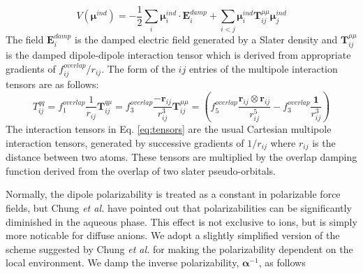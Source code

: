 \documentclass[journal=jctcce,manuscript=article]{achemso}
\begin{document}
\begin{equation}
  V(\bm{\mu}^{ind})=-\frac12\sum_i \bm{\mu}_i^{ind}\cdot \bm{E}_i^{damp} + \sum_{i<j}\bm{\mu}^{ind}_i \bm{T}^{\mu\mu}_{ij}\bm{\mu}^{ind}_j
  \label{eq:induced_dipoles}
\end{equation}
The field $\bm{E}_i^{damp}$ is the damped electric field generated by a Slater density
and $\bm{T}^{\mu\mu}_{ij}$ is the damped dipole-dipole interaction tensor which is derived from appropriate
gradients of $f_{ij}^{overlap}/r_{ij}$. The form of the $ij$ entries of the multipole interaction tensors are as follows:
\begin{subequations}
  \begin{equation}
    T^{qq}_{ij}=f_1^{overlap}\frac{1}{r_{ij}}
    \label{eq:tensors_a}
  \end{equation}
  \begin{equation}
  \bm{T}^{q\mu}_{ij}=f_3^{overlap}\frac{-\bm{r}_{ij}}{r_{ij}^3}
    \label{eq:tensors_b}
  \end{equation}
  \begin{equation}
  \bm{T}^{\mu\mu}_{ij}=\left(f_5^{overlap}\frac{\bm{r}_{ij}\otimes\bm{r}_{ij}}{r_{ij}^5}-f_3^{overlap}\frac{\bm{1}}{r_{ij}^3}\right)
    \label{eq:tensors_c}
  \end{equation}
  \label{eq:tensors}
\end{subequations}
The interaction tensors in Eq. \ref{eq:tensors} are the usual Cartesian multipole interaction
tensors, generated by successive gradients of $1/r_{ij}$ where $r_{ij}$ is the distance between
two atoms. These tensors are multiplied by the overlap damping function derived from the overlap
of two slater pseudo-orbitals\cite{rackers2021polarizable}.

Normally, the dipole polarizability is treated as a constant in polarizable force fields,
but Chung \textit{et al.} have pointed out that polarizabilities
can be significantly diminished in the aqueous phase.\cite{chung2022classical}
This effect is not exclusive to ions, but is simply more noticable for diffuse anions. We adopt a slightly
simplified version of the scheme suggested by Chung \textit{et al.} for making the polarizability dependent on the local
environment. We damp the inverse polarizability, $\bm{\alpha}^{-1}$, as follows
\end{document}
